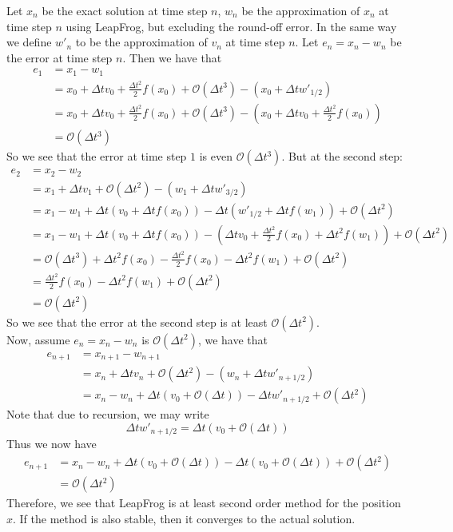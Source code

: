 Let $x_n$ be the exact solution at time step $n$, $w_n$ be the approximation of $x_n$ at time step $n$ using LeapFrog, but excluding the round-off error. In the same way we define $w'_n$ to be the approximation of $v_n$ at time step $n$. Let $e_n=x_n-w_n$ be the error at time step $n$. Then we have that
\begin{align*}
e_1&=x_1-w_1\\
   &=x_0+\Delta t v_0+\frac{\Delta t^2}{2}f(x_0)+\mathcal{O}(\Delta t^3)-(x_0+\Delta tw'_{1/2})\\
   &=x_0+\Delta t v_0+\frac{\Delta t^2}{2}f(x_0)+\mathcal{O}(\Delta t^3)-(x_0+\Delta tv_0+\frac{\Delta t^2}{2}f(x_0))\\
   &=\mathcal{O}(\Delta t^3)
\end{align*}
So we see that the error at time step $1$ is even $\mathcal{O}(\Delta t^3)$. But at the second step:
\begin{align*}
e_2&=x_2-w_2\\
   &=x_1+\Delta tv_1 +\mathcal{O}(\Delta t^2)-(w_1+\Delta t w'_{3/2})\\
   &=x_1-w_1+\Delta t (v_0+\Delta t f(x_0))-\Delta t(w'_{1/2}+\Delta t f(w_1))+\mathcal{O}(\Delta t^2)\\
   &=x_1-w_1+\Delta t (v_0+\Delta t f(x_0))-(\Delta t v_0+ \frac{\Delta t^2}{2}f(x_0)+\Delta t^2 f(w_1))+\mathcal{O}(\Delta t^2)\\
   &=\mathcal{O}(\Delta t ^3)+\Delta t^2f(x_0)-\frac{\Delta t^2}{2}f(x_0)-\Delta t^2f(w_1)+\mathcal{O}(\Delta t^2)\\
   &=\frac{\Delta t^2}{2}f(x_0)-\Delta t^2f(w_1)+\mathcal{O}(\Delta t^2)\\
   &=\mathcal{O}(\Delta t^2)
\end{align*}
So we see that the error at the second step is at least $\mathcal{O}(\Delta t^2)$.\\
Now, assume $e_n=x_n-w_n$ is $\mathcal{O}(\Delta t^2)$, we have that
\begin{align*}
e_{n+1}&=x_{n+1}-w_{n+1}\\
	   &=x_n+\Delta t v_n+\mathcal{O}(\Delta t^2)-(w_n+\Delta t w'_{n+1/2})\\
	   &=x_n-w_n+\Delta t (v_0+\mathcal{O}(\Delta t))-\Delta t w'_{n+1/2}+\mathcal{O}(\Delta t^2)
\end{align*}
Note that due to recursion, we may write\[\Delta t w'_{n+1/2}=\Delta t(v_0+\mathcal{O}(\Delta t))\]
Thus we now have
\begin{align*}
e_{n+1}&=x_n-w_n+\Delta t (v_0+\mathcal{O}(\Delta t))-\Delta t(v_0+\mathcal{O}(\Delta t))+\mathcal{O}(\Delta t^2)\\
	   &=\mathcal{O}(\Delta t^2)
\end{align*}
Therefore, we see that LeapFrog is at least second order method for the position $x$. If the method is also stable, then it converges to the actual solution.\\


